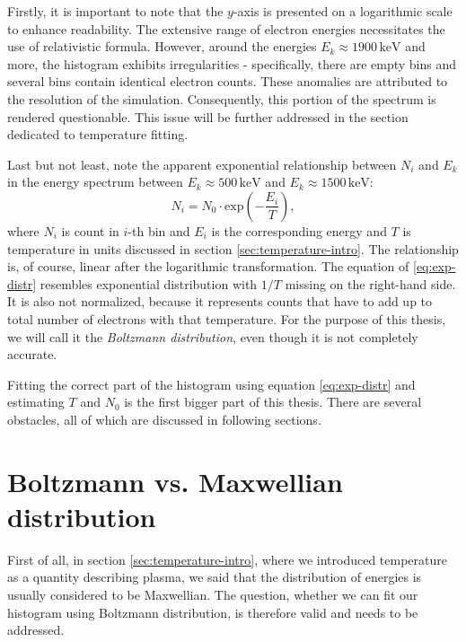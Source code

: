 Firstly, it is important to note that the $y$-axis is presented on a logarithmic scale to enhance readability. The extensive range of electron energies necessitates the use of relativistic formula. However, around the energies $E_k \approx 1900 \, \mathrm{keV}$ and more, the histogram exhibits irregularities - specifically, there are empty bins and several bins contain identical electron counts. These anomalies are attributed to the resolution of the simulation. Consequently, this portion of the spectrum is rendered questionable. This issue will be further addressed in the section dedicated to temperature fitting.

Last but not least, note the apparent exponential relationship between $N_i$ and $E_k$ in the energy spectrum between $E_k \approx 500 \, \mathrm{keV}$ and $E_k \approx 1500 \, \mathrm{keV}$:
\begin{equation}
	\label{eq:exp-distr}
	N_i = N_0 \cdot \mathrm{exp}\left( -\frac{E_i}{T}\right)\mathrm{,}
\end{equation}
where $N_i$ is count in $i$-th bin and $E_i$ is the corresponding energy and $T$ is temperature in units discussed in section \ref{sec:temperature-intro}. The relationship is, of course, linear after the logarithmic transformation. The equation of \ref{eq:exp-distr} resembles exponential distribution with $1/T$ missing on the right-hand side. It is also not normalized, because it represents counts that have to add up to total number of electrons with that temperature. For the purpose of this thesis, we will call it the \textit{Boltzmann distribution}, even though it is not completely accurate.

Fitting the correct part of the histogram using equation \ref{eq:exp-distr} and estimating $T$ and $N_0$ is the first bigger part of this thesis. There are several obstacles, all of which are discussed in following sections.

\section{Boltzmann vs. Maxwellian distribution}
First of all, in section \ref{sec:temperature-intro}, where we introduced temperature as a quantity describing plasma, we said that the distribution of energies is usually considered to be Maxwellian. The question, whether we can fit our histogram using Boltzmann distribution, is therefore valid and needs to be addressed.

